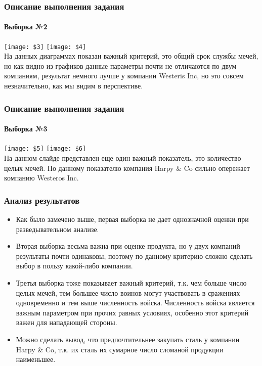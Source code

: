 	\begin{frame}[shrink=4]
		\frametitle{Описание выполнения задания}
		\framesubtitle{Выборка №2}
        \texttt{[image: \$3]}
        \texttt{[image: \$4]}\\
		На данных диаграммах показан важный критерий, это общий срок службы мечей, но как видно из графиков данные параметры почти не отличаются по двум компаниям, результат немного лучше у компании Westeris Inc, но это совсем незначительно, как мы видим в перспективе. 
	\end{frame}
	\begin{frame}[shrink=4]
		\frametitle{Описание выполнения задания}
		\framesubtitle{Выборка №3}
        \texttt{[image: \$5]}
        \texttt{[image: \$6]}\\
		На данном слайде представлен еще один важный показатель, это количество целых мечей. По данному показателю компания Harpy \& Co сильно опережает компанию Westeros Inc.
	\end{frame}
	\begin{frame}
	\frametitle{Анализ результатов}
		\begin{itemize}
			\item {Как было замечено выше, первая выборка не дает однозначной оценки при разведывательном анализе.}
			\item {Вторая выборка весьма важна при оценке продукта, но у двух компаний результаты почти одинаковы, поэтому по данному критерию сложно сделать выбор в пользу какой-либо компании. }
			\item {Третья выборка тоже показывает важный критерий, т.к. чем больше число целых мечей, тем большее число воинов могут участвовать в сражениях одновременно и тем выше численность войска. Численность войска является важным параметром при прочих равных условиях, особенно этот критерий важен для нападающей стороны.}
			\item {Можно сделать вывод, что предпочтительнее закупать сталь у компании Harpy \& Co, т.к. их сталь их сумарное число сломаной продукции наименьшее.}
		\end{itemize}
	\end{frame}
